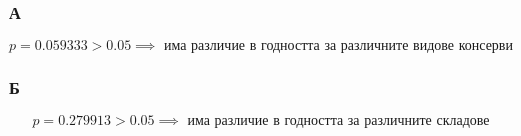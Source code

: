 \documentclass[a4paper,fleqn,12pt]{article}
\begin{document}
\subsubsection{А}
$$
p=0.059333 > 0.05 \implies \text{ има различие в годността за различните видове консерви}
$$

\subsubsection{Б}
$$
p=0.279913 > 0.05 \implies \text{ има различие в годността за различните складове}
$$
\end{document}
